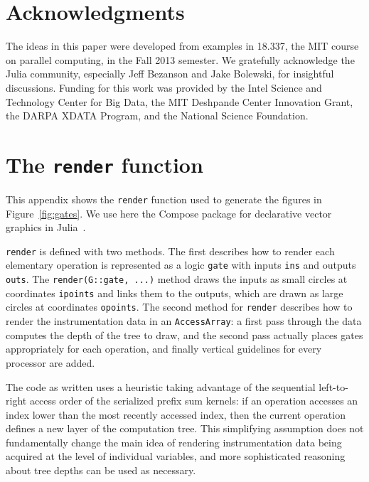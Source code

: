 \documentclass{sig-alternate}
\newcommand{\code}[1]{\texttt{#1}}
\begin{document}
\section{Acknowledgments}

The ideas in this paper were developed from examples in 18.337, the MIT course
on parallel computing, in the Fall 2013 semester. We gratefully acknowledge the
Julia community, especially Jeff Bezanson and Jake Bolewski, for insightful
discussions. Funding for this work was provided by the Intel Science and
Technology Center for Big Data, the MIT Deshpande Center Innovation Grant, the
DARPA XDATA Program, and the National Science Foundation.




\appendix

\section{The \code{render} function}
\label{sec:render}

This appendix shows the \code{render} function used to generate the figures in
Figure~\ref{fig:gates}. We use here the Compose package for declarative vector
graphics in Julia~\cite{Compose.jl}.

\code{render} is defined with two methods. The first describes how to render
each elementary operation is represented as a logic \code{gate} with inputs
\code{ins} and outputs \code{outs}. The \code{render(\allowbreak{}G::gate, ...)} method
draws the inputs as small circles at coordinates \code{ipoints} and links them
to the outputs, which are drawn as large circles at coordinates \code{opoints}.
The second method for \code{render} describes how to render the instrumentation
data in an \code{AccessArray}: a first pass through the data computes the depth
of the tree to draw, and the second pass actually places gates appropriately
for each operation, and finally vertical guidelines for every processor are
added.

The code as written uses a heuristic taking advantage of the sequential
left-to-right access order of the serialized prefix sum kernels: if an
operation accesses an index lower than the most recently accessed index, then
the current operation defines a new layer of the computation tree. This
simplifying assumption does not fundamentally change the main idea of rendering
instrumentation data being acquired at the level of individual variables, and
more sophisticated reasoning about tree depths can be used as necessary.
\end{document}
